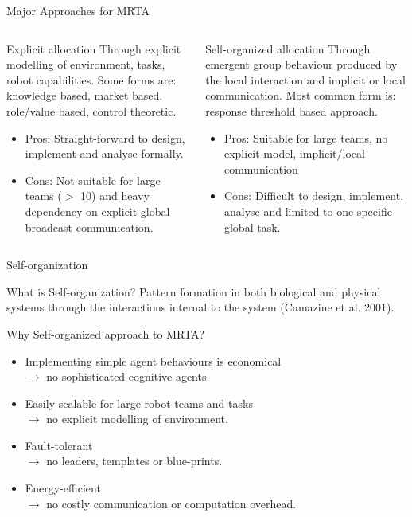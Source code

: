 \documentclass[handout,draft]{beamer}
\begin{document}
\begin{frame}[t]{Major Approaches for MRTA}
 \begin{columns}
\begin{block}{Explicit allocation}
Through \alert{explicit modelling} of environment, tasks, robot capabilities. Some forms are: knowledge based, market based, role/value based, control theoretic. 
\begin{itemize}
\item \small Pros: Straight-forward to design, implement and analyse formally. %
\item \small Cons: \alert{Not suitable for large teams ($>$ 10) and heavy dependency on explicit global broadcast communication.}
\end{itemize}
\end{block}
\begin{block}{Self-organized allocation}
Through \alert{emergent group behaviour} produced by the local interaction and implicit or local communication. Most common form is: response threshold based approach.
\begin{itemize}
\item \small Pros: Suitable for large teams, no explicit model, implicit/local communication
\item \small Cons: \alert{Difficult to design, implement, analyse and limited to one specific global task.} %
\end{itemize}
\end{block}
\end{columns}
\end{frame}
\begin{frame}[t]{Self-organization}
\begin{block}{What is Self-organization?}
Pattern formation in both biological and physical systems through the interactions internal to the system (Camazine et al. 2001).%
\end{block}
\begin{block}{Why Self-organized approach to MRTA?}
\begin{itemize}
\item \normalsize \alert{Implementing simple agent behaviours is economical}\\
$\rightarrow$ \small no sophisticated cognitive agents.
\item \normalsize \alert{Easily scalable for large robot-teams and tasks}\\  
$\rightarrow$ \small no explicit modelling of environment.
\item \normalsize \alert{Fault-tolerant}\\ 
$\rightarrow$ \small no leaders, templates or blue-prints.
\item \normalsize \alert{Energy-efficient}\\
$\rightarrow$ \small no costly communication or computation overhead.
\end{itemize}
\end{block}
\end{frame}
\end{document}

